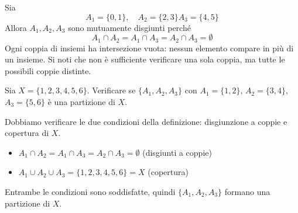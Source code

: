 \begin{esempio}
    Sia 
    \[
    A_1 = \{ 0,1\} , \quad A_2= \{2,3\}  A_3 = \{4,5\}
    \]
    Allora $A_1, A_2, A_3 $ sono mutuamente disgiunti perché
    \[
        A_1 \cap A_2 = A_1 \cap A_3 = A_2 \cap A_3  = \emptyset
    \]
    Ogni coppia di insiemi ha intersezione vuota: nessun elemento compare in più di un insieme. Si noti che non è sufficiente verificare una sola coppia, ma tutte le possibili coppie distinte.
\end{esempio}





\begin{esempio}
    Sia $X = \{1,2,3,4,5,6\}$. Verificare se $\{A_1, A_2, A_3\}$ con 
$A_1 = \{1,2\}$, $A_2 = \{3,4\}$, $A_3 = \{5,6\}$ è una partizione di $X$.
\medskip

\begin{strategiabox}
    Dobbiamo verificare le due condizioni della definizione: disgiunzione a coppie e copertura di \(X\).
\end{strategiabox}

\begin{itemize}
    \item $A_1 \cap A_2 = A_1 \cap A_3 = A_2 \cap A_3 = \emptyset$ \quad (disgiunti a coppie)
    \item $A_1 \cup A_2 \cup A_3 = \{1,2,3,4,5,6\} = X$ \quad (copertura)
\end{itemize}
Entrambe le condizioni sono soddisfatte, quindi $\{A_1, A_2, A_3\}$ formano una partizione di $X$.
\end{esempio}

